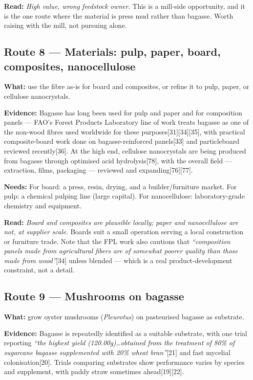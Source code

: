 \documentclass[11pt]{article}
\newcommand{\src}[1]{[#1]}
\begin{document}
\textbf{Read:} \emph{High value, wrong feedstock owner.} This is a mill-side
opportunity, and it is the one route where the material is press mud rather
than bagasse. Worth raising with the mill, not pursuing alone.

\subsection{Route 8 --- Materials: pulp, paper, board, composites, nanocellulose}

\textbf{What:} use the fibre as-is for board and composites, or refine it to
pulp, paper, or cellulose nanocrystals.

\textbf{Evidence:} Bagasse has long been used for pulp and paper and for
composition panels --- FAO's Forest Products Laboratory line of work treats
bagasse as one of the non-wood fibres used worldwide for these purposes\src{31}\src{34}\src{35},
with practical composite-board work done on bagasse-reinforced panels\src{33}
and particleboard reviewed recently\src{36}. At the high end, cellulose
nanocrystals are being produced from bagasse through optimised acid
hydrolysis\src{78}, with the overall field --- extraction, films, packaging ---
reviewed and expanding\src{76}\src{77}.

\textbf{Needs:} For board: a press, resin, drying, and a builder/furniture
market. For pulp: a chemical pulping line (large capital). For nanocellulose:
laboratory-grade chemistry and equipment.

\textbf{Read:} \emph{Board and composites are plausible locally; paper and
nanocellulose are not, at supplier scale.} Boards suit a small operation
serving a local construction or furniture trade. Note that the FPL work also
cautions that \emph{``composition panels made from agricultural fibers are of
somewhat poorer quality than those made from wood''}\src{34} unless blended ---
which is a real product-development constraint, not a detail.

\subsection{Route 9 --- Mushrooms on bagasse}

\textbf{What:} grow oyster mushrooms (\emph{Pleurotus}) on pasteurised bagasse
as substrate.

\textbf{Evidence:} Bagasse is repeatedly identified as a suitable substrate,
with one trial reporting \emph{``the highest yield (120.00g)\ldots{}obtained from
the treatment of 80\% of sugarcane bagasse supplemented with 20\% wheat
bran''}\src{21} and fast mycelial colonisation\src{20}. Trials comparing
substrates show performance varies by species and supplement, with paddy straw
sometimes ahead\src{19}\src{22}.
\end{document}

